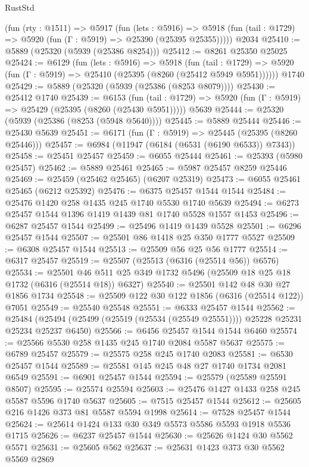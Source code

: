 \begin{lexlean}{RustStd}
\begin{coremodule}
    (fun (rty : @1511) =>
    @5917
      (fun (lets : @5916) =>
      @5918 (fun (tail : @1729) => @5920 (fun (Γ : @5919) => @25390 (@25395 @25355)))))
    @2034
@25410 := @5889 (@25320 (@5939 (@25386 @8254)))
@25412 := @8261 @25350 @25025
@25424 := @6129
    (fun (lets : @5916) =>
    @5918
      (fun (tail : @1729) =>
      @5920 (fun (Γ : @5919) => @25410 (@25395 (@8260 (@25412 @5949 @5951))))))
    @1740
@25429 := @5889 (@25320 (@5939 (@25386 (@8253 @8079))))
@25430 := @25412 @1740
@25439 := @6153
    (fun (tail : @1729) => @5920 (fun (Γ : @5919) => @25429 (@25395 (@8260 (@25430 @5951)))))
    @5639
@25444 := @25320 (@5939 (@25386 (@8253 (@5948 @5640))))
@25445 := @5889 @25444
@25446 := @25430 @5639
@25451 := @6171 (fun (Γ : @5919) => @25445 (@25395 (@8260 @25446)))
@25457 := @6984 (@11947 (@6184 (@6531 (@6190 @6533)) @7343))
@25458 := @25451 @25457
@25459 := @6055 @25444
@25461 := @25393 (@5980 @25457)
@25462 := @5889 @25461
@25465 := @5987 @25457 @8259 @25446
@25469 := @25459 (@25462 @25465) (@6207 @25319)
@25473 := @6055 @25461 @25465 (@6212 @25392)
@25476 := @6375 @25457 @1544 @1544
@25484 := @25476 @1420 @258 @1435 @245 @1740 @5530 @1740 @5639
@25494 := @6273 @25457 @1544 @1396 @1419 @1439 @81 @1740 @5528 @1557 @1453
@25496 := @6287 @25457 @1544
@25499 := @25496 @1419 @1439 @5528
@25501 := @6296 @25457 @1544
@25507 := @25501 @86 @1418 @25 @350 @1777 @5527
@25509 := @6308 @25457 @1544
@25513 := @25509 @56 @25 @56 @1777
@25514 := @6317 @25457
@25519 := @25507 (@25513 (@6316 (@25514 @56)) @6576)
@25534 := @25501 @46 @511 @25 @349 @1732 @5496 (@25509 @18 @25 @18 @1732 (@6316 (@25514 @18)) @6327)
@25540 := @25501 @142 @48 @30 @27 @1856 @1734
@25548 := @25509 @122 @30 @122 @1856 (@6316 (@25514 @122)) @7051
@25549 := @25540 @25548
@25551 := @6333 @25457 @1544
@25562 := @25484
    (@25494 (@25499 (@25519 (@25534 (@25549 @25551)))) @25228 @25231 @25234 @25237 @6450)
@25566 := @6456 @25457 @1544 @1544 @6460
@25574 := @25566 @5530 @258 @1435 @245 @1740 @2084 @5587 @5637
@25575 := @6789 @25457
@25579 := @25575 @258 @245 @1740 @2083
@25581 := @6530 @25457 @1544
@25589 := @25581 @145 @245 @48 @27 @1740 @1734 @2081 @6549
@25591 := @6901 @25457 @1544
@25594 := @25579 (@25589 @25591 @8507)
@25595 := @25574 @25594
@25603 := @25476 @1427 @1433 @258 @245 @5587 @5596 @1740 @5637
@25605 := @7515 @25457 @1544
@25612 := @25605 @216 @1426 @373 @81 @5587 @5594 @1998
@25614 := @7528 @25457 @1544
@25624 := @25614 @1424 @133 @30 @349 @5573 @5586 @5593 @1918 @5536 @1715
@25626 := @6237 @25457 @1544
@25630 := @25626 @1424 @30 @5562 @5571
@25631 := @25605 @562
@25637 := @25631 @1423 @373 @30 @5562 @5569 @2869

\end{coremodule}
\end{lexlean}
